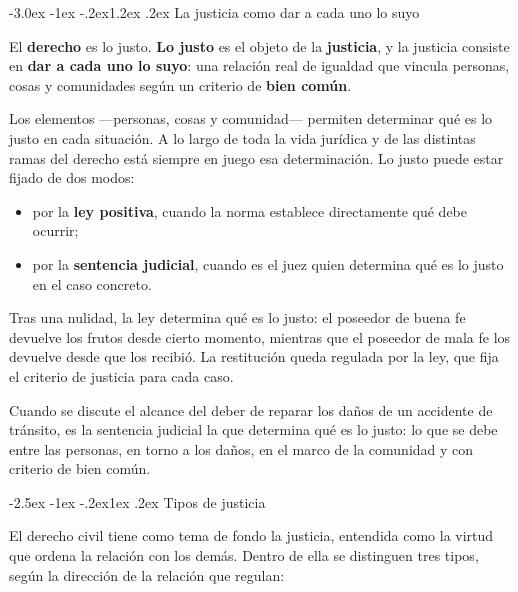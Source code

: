 \documentclass[12pt,oneside]{book}
\makeatletter
\renewcommand\section{\@startsection{section}{1}{\z@}%
  {-3.0ex \@plus -1ex \@minus -.2ex}{1.2ex \@plus .2ex}%
  {\normalfont\large\bfseries\color{acento}}}
\renewcommand\subsection{\@startsection{subsection}{2}{\z@}%
  {-2.5ex \@plus -1ex \@minus -.2ex}{1ex \@plus .2ex}%
  {\normalfont\normalsize\bfseries}}
\makeatother
\begin{document}
\section{La justicia como dar a cada uno lo suyo}

\begin{definicion}
El \textbf{derecho} es lo justo. \textbf{Lo justo} es el objeto de la \textbf{justicia}, y la justicia consiste en \textbf{dar a cada uno lo suyo}: una relación real de igualdad que vincula personas, cosas y comunidades según un criterio de \textbf{bien común}.
\end{definicion}

Los elementos ---personas, cosas y comunidad--- permiten determinar qué es lo justo en cada situación. A lo largo de toda la vida jurídica y de las distintas ramas del derecho está siempre en juego esa determinación. Lo justo puede estar fijado de dos modos:

\begin{itemize}
\item por la \textbf{ley positiva}, cuando la norma establece directamente qué debe ocurrir;
\item por la \textbf{sentencia judicial}, cuando es el juez quien determina qué es lo justo en el caso concreto.
\end{itemize}

\begin{ejemplo}
Tras una nulidad, la ley determina qué es lo justo: el poseedor de buena fe devuelve los frutos desde cierto momento, mientras que el poseedor de mala fe los devuelve desde que los recibió. La restitución queda regulada por la ley, que fija el criterio de justicia para cada caso.
\end{ejemplo}

\begin{ejemplo}
Cuando se discute el alcance del deber de reparar los daños de un accidente de tránsito, es la sentencia judicial la que determina qué es lo justo: lo que se debe entre las personas, en torno a los daños, en el marco de la comunidad y con criterio de bien común.
\end{ejemplo}

\subsection{Tipos de justicia}

El derecho civil tiene como tema de fondo la justicia, entendida como la virtud que ordena la relación con los demás. Dentro de ella se distinguen tres tipos, según la dirección de la relación que regulan:
\end{document}
